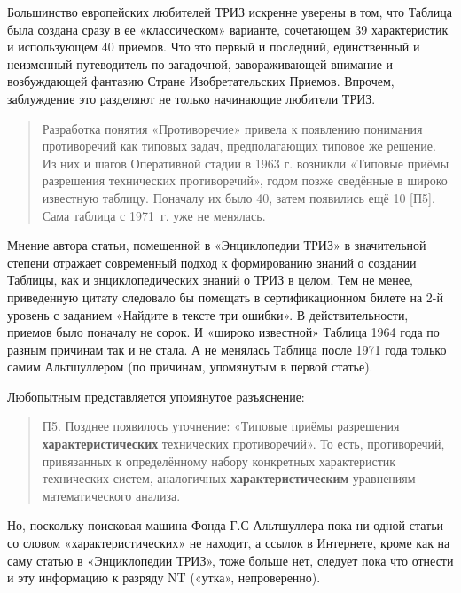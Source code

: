 \documentclass[11pt,a4paper]{article}
\begin{document}
Большинство европейских любителей ТРИЗ искренне уверены в том, что Таблица
была создана сразу в ее «классическом» варианте, сочетающем 39 характеристик и
использующем 40 приемов. Что это первый и последний, единственный и неизменный
путеводитель по загадочной, завораживающей внимание и возбуждающей фантазию
Стране Изобретательских Приемов. Впрочем, заблуждение это разделяют не только
начинающие любители ТРИЗ. 
\begin{quote}
  Разработка понятия «Противоречие» привела к появлению понимания противоречий
  как типовых задач, предполагающих типовое же решение. Из них и шагов
  Оперативной стадии в 1963 г. возникли «Типовые приёмы разрешения технических
  противоречий», годом позже сведённые в широко известную таблицу. Поначалу
  их было 40, затем появились ещё 10 [П5]. Сама таблица с 1971~г. уже не
  менялась. \cite{Korolyev1998}
\end{quote}
Мнение автора статьи, помещенной в «Энциклопедии ТРИЗ» в значительной степени
отражает современный подход к формированию знаний о создании Таблицы, как и
энциклопедических знаний о ТРИЗ в целом. Тем не менее, приведенную цитату
следовало бы помещать в сертификационном билете на 2-й уровень с заданием
«Найдите в тексте три ошибки». В действительности, приемов было поначалу не
сорок.  И «широко известной» Таблица 1964 года по разным причинам так и не
стала.  А не менялась Таблица после 1971 года только самим Альтшуллером (по
причинам, упомянутым в первой статье).

Любопытным представляется упомянутое разъяснение: 
\begin{quote}
  П5. Позднее появилось уточнение: «Типовые приёмы разрешения
  \textbf{характеристических} технических противоречий». То есть,
  противоречий, привязанных к определённому набору конкретных характеристик
  технических систем, аналогичных \textbf{характеристическим} уравнениям
  математического анализа.
\end{quote}
Но, поскольку поисковая машина Фонда Г.С Альтшуллера пока ни одной статьи со
словом «характеристических» не находит, а ссылок в Интернете, кроме как на
саму статью в «Энциклопедии ТРИЗ», тоже больше нет, следует пока что отнести и
эту информацию к разряду NT («утка», непроверенно).
\end{document}
